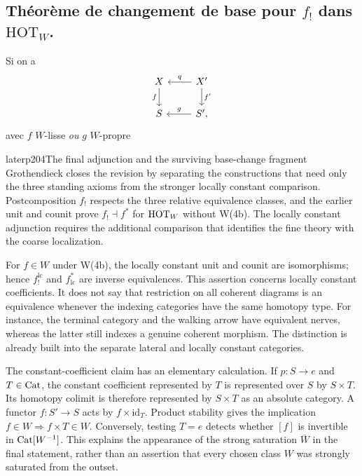 \subsection*{\protect{} Théorème de changement de base pour $f_!$ dans $\mathrm{HOT}_W$.}

Si on a
\[
\begin{tikzcd}
X \arrow[d, "f"'] & X' \arrow[l, "q"'] \arrow[d, "f'"] \\
S & S', \arrow[l, "g"']
\end{tikzcd}
\]
avec $f$ $W$-lisse \textit{ou} $g$ $W$-propre


\begin{dcomment}{later}{p204}{The final adjunction and the surviving base-change fragment}
Grothendieck closes the revision by separating the constructions that need only the three standing axioms from the stronger locally constant comparison. Postcomposition $f_!$ respects the three relative equivalence classes, and the earlier unit and counit prove $f_!\dashv f^*$ for $\mathrm{HOT}_W$ without W(4b). The locally constant adjunction requires the additional comparison that identifies the fine theory with the coarse localization.

For $f\in W$ under W(4b), the locally constant unit and counit are isomorphisms; hence $f_!^{\mathrm{lc}}$ and $f^*_{\mathrm{lc}}$ are inverse equivalences. This assertion concerns locally constant coefficients. It does not say that restriction on all coherent diagrams is an equivalence whenever the indexing categories have the same homotopy type. For instance, the terminal category and the walking arrow have equivalent nerves, whereas the latter still indexes a genuine coherent morphism. The distinction is already built into the separate lateral and locally constant categories.

The constant-coefficient claim has an elementary calculation. If $p:S\to e$ and $T\in\mathrm{Cat}$, the constant coefficient represented by $T$ is represented over $S$ by $S\times T$. Its homotopy colimit is therefore represented by $S\times T$ as an absolute category. A functor $f:S'\to S$ acts by $f\times\mathrm{id}_T$. Product stability gives the implication $f\in W\Rightarrow f\times T\in W$. Conversely, testing $T=e$ detects whether $[f]$ is invertible in $\mathrm{Cat}[W^{-1}]$. This explains the appearance of the strong saturation $\overline W$ in the final statement, rather than an assertion that every chosen class $W$ was strongly saturated from the outset.


\end{dcomment}
